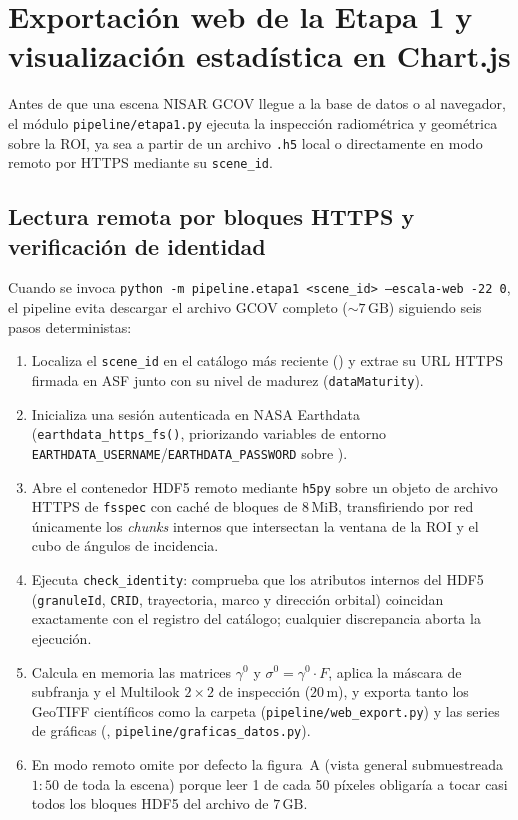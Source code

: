 \documentclass[11pt,a4paper]{article}
\newcommand{\src}[1]{\nolinkurl{#1}}
\newcommand{\unit}[1]{\mathrm{#1}}
\newcommand{\gz}{\ensuremath{\gamma^{0}}}
\newcommand{\sz}{\ensuremath{\sigma^{0}}}
\begin{document}
\section{Exportación web de la Etapa 1 y visualización estadística en Chart.js}
\label{sec:arq-etapa1-chartjs}

Antes de que una escena NISAR GCOV llegue a la base de datos o al navegador, el módulo \src{pipeline/etapa1.py}
ejecuta la inspección radiométrica y geométrica sobre la ROI, ya sea a partir de un archivo \texttt{.h5} local
o directamente en modo remoto por HTTPS mediante su \texttt{scene\_id}.

\subsection{Lectura remota por bloques HTTPS y verificación de identidad}

Cuando se invoca \texttt{python -m pipeline.etapa1 <scene\_id> --escala-web -22 0}, el pipeline evita descargar
el archivo GCOV completo ($\sim 7\,\unit{GB}$) siguiendo seis pasos deterministas:
\begin{enumerate}
  \item Localiza el \texttt{scene\_id} en el catálogo más reciente () y extrae
        su URL HTTPS firmada en ASF junto con su nivel de madurez (\texttt{dataMaturity}).
  \item Inicializa una sesión autenticada en NASA Earthdata (\texttt{earthdata\_https\_fs()}, priorizando
        variables de entorno \texttt{EARTHDATA\_USERNAME}/\texttt{EARTHDATA\_PASSWORD} sobre ).
  \item Abre el contenedor HDF5 remoto mediante \texttt{h5py} sobre un objeto de archivo HTTPS de \texttt{fsspec}
        con caché de bloques de $8\,\unit{MiB}$, transfiriendo por red únicamente los \emph{chunks} internos que
        intersectan la ventana de la ROI y el cubo de ángulos de incidencia.
  \item Ejecuta \texttt{check\_identity}: comprueba que los atributos internos del HDF5 (\texttt{granuleId},
        \texttt{CRID}, trayectoria, marco y dirección orbital) coincidan exactamente con el registro del
        catálogo; cualquier discrepancia aborta la ejecución.
  \item Calcula en memoria las matrices $\gz$ y $\sz = \gz \cdot F$, aplica la máscara de subfranja y el
        Multilook $2\times 2$ de inspección ($20\,\unit{m}$), y exporta tanto los GeoTIFF científicos como la
        carpeta  (\src{pipeline/web\_export.py}) y las series de gráficas (,
        \src{pipeline/graficas\_datos.py}).
  \item En modo remoto omite por defecto la figura~A (vista general submuestreada $1:50$ de toda la escena)
        porque leer 1 de cada 50 píxeles obligaría a tocar casi todos los bloques HDF5 del archivo de $7\,\unit{GB}$.
\end{enumerate}
\end{document}
